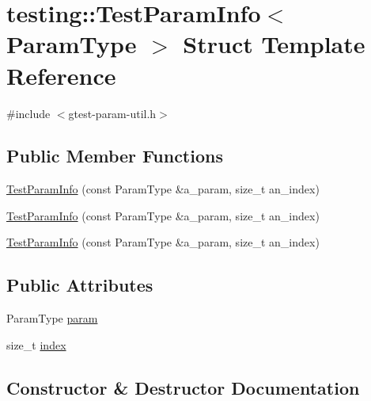 \hypertarget{structtesting_1_1_test_param_info}{}\section{testing\+::Test\+Param\+Info$<$ Param\+Type $>$ Struct Template Reference}
\label{structtesting_1_1_test_param_info}


{\ttfamily \#include $<$gtest-\/param-\/util.\+h$>$}

\subsection*{Public Member Functions}
\begin{DoxyCompactItemize}
\item 
\mbox{\hyperlink{structtesting_1_1_test_param_info_aa54199319bcad5a33c8538ecaecb6de5}{Test\+Param\+Info}} (const Param\+Type \&a\+\_\+param, size\+\_\+t an\+\_\+index)
\item 
\mbox{\hyperlink{structtesting_1_1_test_param_info_aa54199319bcad5a33c8538ecaecb6de5}{Test\+Param\+Info}} (const Param\+Type \&a\+\_\+param, size\+\_\+t an\+\_\+index)
\item 
\mbox{\hyperlink{structtesting_1_1_test_param_info_aa54199319bcad5a33c8538ecaecb6de5}{Test\+Param\+Info}} (const Param\+Type \&a\+\_\+param, size\+\_\+t an\+\_\+index)
\end{DoxyCompactItemize}
\subsection*{Public Attributes}
\begin{DoxyCompactItemize}
\item 
Param\+Type \mbox{\hyperlink{structtesting_1_1_test_param_info_a146d921039f9da8b1336f7cc6e8436c2}{param}}
\item 
size\+\_\+t \mbox{\hyperlink{structtesting_1_1_test_param_info_ad4d7bc02cbcc571eb3c1d2ec3ba5bb53}{index}}
\end{DoxyCompactItemize}


\subsection{Constructor \& Destructor Documentation}
\mbox{\label{structtesting_1_1_test_param_info_aa54199319bcad5a33c8538ecaecb6de5}} 
